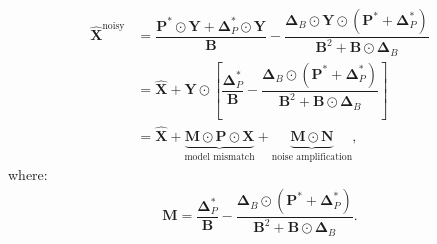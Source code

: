 \begin{align}
    \bm{\hat{X}}^{\text{noisy}} &= \dfrac{\bm{P}^* \odot \bm{Y} +\bm{\Delta}_P^* \odot \bm{Y}}{\bm{B}} - \dfrac{\bm{\Delta}_B \odot \bm{Y} \odot(\bm{P}^* +\bm{\Delta}_P^*)}{\bm{B}^2 + \bm{B} \odot \bm{\Delta}_B} \nonumber\\
    &= \bm{\hat{X}} + \bm{Y} \odot \left[ \dfrac{\bm{\Delta}_P^*}{\bm{B}} - \dfrac{\bm{\Delta}_B \odot (\bm{P}^* + \bm{\Delta}_P^*)}{\bm{B}^2 + \bm{B} \odot \bm{\Delta}_B}  \right]  \nonumber\\
    &=\bm{\hat{X}} + \underbrace{\bm{M} \odot \bm{P} \odot  \bm{X}}_{\text{model mismatch}} + \underbrace{\bm{M} \odot \bm{N}}_{\text{noise amplification}}, \label{eq:noisy_wiener_app}
\end{align}
where:
\begin{align}
    \bm{M} = \dfrac{\bm{\Delta}_P^*}{\bm{B}} - \dfrac{\bm{\Delta}_B \odot (\bm{P}^* + \bm{\Delta}_P^*)}{\bm{B}^2 + \bm{B} \odot \bm{\Delta}_B}.
\end{align}
